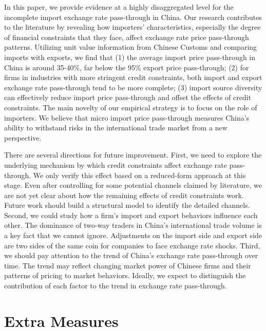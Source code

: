 \documentclass[12pt]{article}
\begin{document}
In this paper, we provide evidence at a highly disaggregated level for the incomplete import exchange rate pass-through in China. Our research contributes to the literature by revealing how importers' characteristics, especially the degree of financial constraints that they face, affect exchange rate price pass-through patterns. Utilizing unit value information from Chinese Customs and comparing imports with exports, we find that (1) the average import price pass-through in China is around 35-40\%, far below the 95\% export price pass-through; (2) for firms in industries with more stringent credit constraints, both import and export exchange rate pass-through tend to be more complete; (3) import source diversity can effectively reduce import price pass-through and offset the effects of credit constraints. The main novelty of our empirical strategy is to focus on the role of importers. We believe that micro import price pass-through measures China's ability to withstand risks in the international trade market from a new perspective.

There are several directions for future improvement. First, we need to explore the underlying mechanism by which credit constraints affect exchange rate pass-through. We only verify this effect based on a reduced-form approach at this stage. Even after controlling for some potential channels claimed by literature, we are not yet clear about how the remaining effects of credit constraints work. Future work should build a structural model to identify the detailed channels. Second, we could study how a firm's import and export behaviors influence each other. The dominance of two-way traders in China's international trade volume is a key fact that we cannot ignore. Adjustments on the import side and export side are two sides of the same coin for companies to face exchange rate shocks. Third, we should pay attention to the trend of China's exchange rate pass-through over time. The trend may reflect changing market power of Chinese firms and their patterns of pricing to market behaviors. Ideally, we expect to distinguish the contribution of each factor to the trend in exchange rate pass-through. 

\newpage 


\appendix

\section{Extra Measures}\label{Appendix-Measures}
\end{document}
